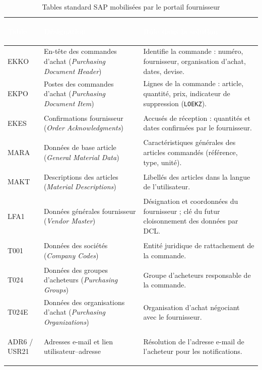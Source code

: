 \documentclass[12pt,a4paper,oneside]{report}
\begin{document}
\begin{table}[H]
\centering
\renewcommand{\arraystretch}{1.5}
\setlength{\tabcolsep}{10pt}
\renewcommand{\tabularxcolumn}[1]{m{#1}}
\begin{tabularx}{\textwidth}{>{\bfseries\ttfamily\color{MidnightBlue}\raggedright\arraybackslash}m{2.4cm} >{\raggedright\arraybackslash}m{4.6cm} >{\raggedright\arraybackslash}X}
\toprule
\rowcolor{RoyalBlue!65}
\textcolor{white}{\textbf{Table}} & \textcolor{white}{\textbf{Désignation}} & \textcolor{white}{\textbf{Rôle dans la solution}} \\
\midrule
EKKO & En-tête des commandes d'achat (\textit{Purchasing Document Header}) & Identifie la commande : numéro, fournisseur, organisation d'achat, dates, devise. \\
EKPO & Postes des commandes d'achat (\textit{Purchasing Document Item}) & Lignes de la commande : article, quantité, prix, indicateur de suppression (\texttt{LOEKZ}). \\
EKES & Confirmations fournisseur (\textit{Order Acknowledgments}) & Accusés de réception : quantités et dates confirmées par le fournisseur. \\
MARA & Données de base article (\textit{General Material Data}) & Caractéristiques générales des articles commandés (référence, type, unité). \\
MAKT & Descriptions des articles (\textit{Material Descriptions}) & Libellés des articles dans la langue de l'utilisateur. \\
LFA1 & Données générales fournisseur (\textit{Vendor Master}) & Désignation et coordonnées du fournisseur ; clé du futur cloisonnement des données par DCL. \\
T001 & Données des sociétés (\textit{Company Codes}) & Entité juridique de rattachement de la commande. \\
T024 & Données des groupes d'acheteurs (\textit{Purchasing Groups}) & Groupe d'acheteurs responsable de la commande. \\
T024E & Données des organisations d'achat (\textit{Purchasing Organizations}) & Organisation d'achat négociant avec le fournisseur. \\
ADR6 / USR21 & Adresses e-mail et lien utilisateur--adresse & Résolution de l'adresse e-mail de l'acheteur pour les notifications. \\
\bottomrule
\end{tabularx}
\caption{Tables standard SAP mobilisées par le portail fournisseur}
\label{tab:tables-std}
\end{table}
\end{document}
